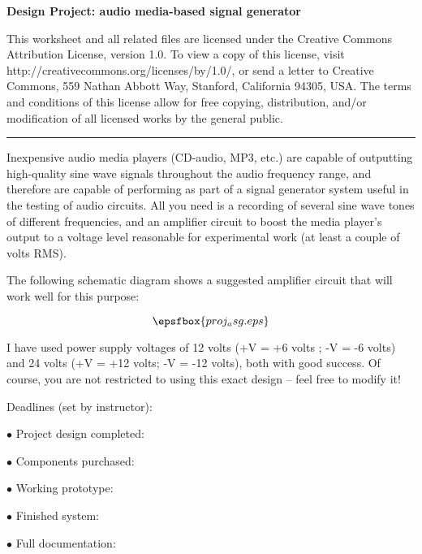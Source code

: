
\centerline{\bf Design Project: audio media-based signal generator} \bigskip 
 
This worksheet and all related files are licensed under the Creative Commons Attribution License, version 1.0.  To view a copy of this license, visit http://creativecommons.org/licenses/by/1.0/, or send a letter to Creative Commons, 559 Nathan Abbott Way, Stanford, California 94305, USA.  The terms and conditions of this license allow for free copying, distribution, and/or modification of all licensed works by the general public.

\bigskip 

\hrule

\vskip 10pt

Inexpensive audio media players (CD-audio, MP3, etc.) are capable of outputting high-quality sine wave signals throughout the audio frequency range, and therefore are capable of performing as part of a signal generator system useful in the testing of audio circuits.  All you need is a recording of several sine wave tones of different frequencies, and an amplifier circuit to boost the media player's output to a voltage level reasonable for experimental work (at least a couple of volts RMS).

The following schematic diagram shows a suggested amplifier circuit that will work well for this purpose:

$$\epsfbox{proj_asg.eps}$$

I have used power supply voltages of 12 volts (+V = +6 volts ; -V = -6 volts) and 24 volts (+V = +12 volts; -V = -12 volts), both with good success.  Of course, you are not restricted to using this exact design -- feel free to modify it!

\vskip 10pt

\noindent
Deadlines (set by instructor):

\medskip
\item{$\bullet$} Project design completed: 
\item{$\bullet$} Components purchased:
\item{$\bullet$} Working prototype:
\item{$\bullet$} Finished system:
\item{$\bullet$} Full documentation:
\medskip





